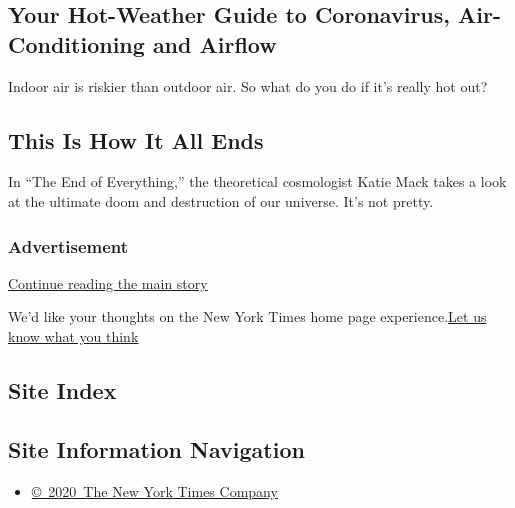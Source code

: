 \hypertarget{your-hot-weather-guide-to-coronavirus-air-conditioning-and-airflow}{%
\subsection{Your Hot-Weather Guide to Coronavirus, Air-Conditioning and
Airflow}\label{your-hot-weather-guide-to-coronavirus-air-conditioning-and-airflow}}

Indoor air is riskier than outdoor air. So what do you do if it's really
hot out?

\href{/2020/08/08/science/coronavirus-spread-air-conditioning.html}{}

\href{/2020/08/04/books/review/the-end-of-everything-katie-mack.html}{}

\hypertarget{this-is-how-it-all-ends}{%
\subsection{This Is How It All Ends}\label{this-is-how-it-all-ends}}

In ``The End of Everything,'' the theoretical cosmologist Katie Mack
takes a look at the ultimate doom and destruction of our universe. It's
not pretty.

\href{/2020/08/04/books/review/the-end-of-everything-katie-mack.html}{}

\hypertarget{advertisement}{%
\subsubsection{Advertisement}\label{advertisement}}

\protect\hyperlink{after-dfp-ad-mid1-large}{Continue reading the main
story}

We'd like your thoughts on the New York Times home page
experience.\href{http://nyt.qualtrics.com/jfe/form/SV_eFJmKj9v0krSE0l}{Let
us know what you think}

\hypertarget{site-index}{%
\subsection{Site Index}\label{site-index}}

\hypertarget{site-information-navigation}{%
\subsection{Site Information
Navigation}\label{site-information-navigation}}

\begin{itemize}
\tightlist
\item
  \href{https://help.nytimes.com/hc/en-us/articles/115014792127-Copyright-notice}{©~2020~The
  New York Times Company}
\end{itemize}

